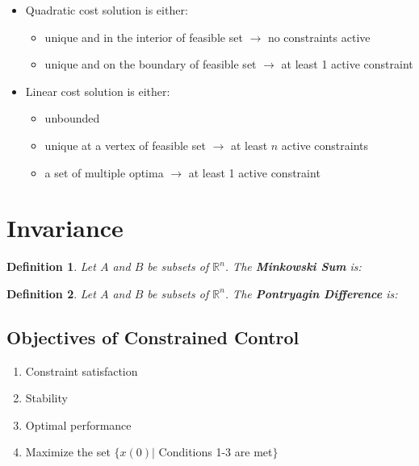 \documentclass[8pt,a4paper]{scrartcl}
\newtheorem{define}{Definition}
\begin{document}
\begin{multicols*}{3}
\begin{itemize}
\item Quadratic cost solution is either:
\begin{itemize}
\item unique and in the interior of feasible set $\rightarrow$ no constraints active
\item unique and on the boundary of feasible set $\rightarrow$ at least 1 active constraint
\end{itemize}
\item Linear cost solution is either:
\begin{itemize}
\item unbounded
\item unique at a vertex of feasible set $\rightarrow$ at least $n$ active constraints
\item a set of multiple optima $\rightarrow$ at least 1 active constraint
\end{itemize}
\end{itemize}

\section{Invariance}

\begin{define}
Let $A$ and $B$ be subsets of $\mathbb{R}^n$. The \textbf{Minkowski Sum} is:

\end{define}

\begin{define}
Let $A$ and $B$ be subsets of $\mathbb{R}^n$. The \textbf{Pontryagin Difference} is:

\end{define}

\subsection{Objectives of Constrained Control}

\begin{enumerate}
\item Constraint satisfaction
\item Stability
\item Optimal performance
\item Maximize the set $\{x(0)|$ Conditions 1-3 are met$\}$
\end{enumerate}


\end{multicols*}
\end{document}
